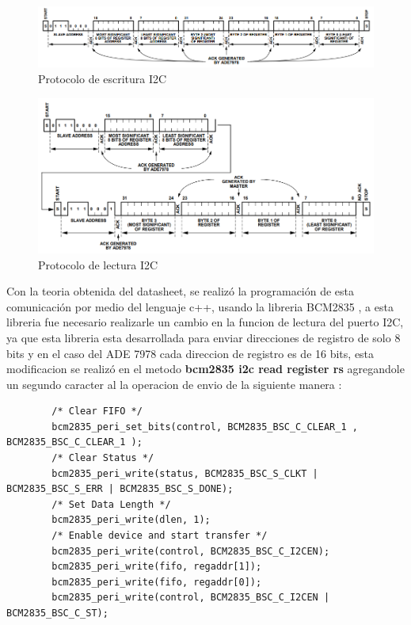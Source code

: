         \begin{figure}[H]
            \begin{center}
                \includegraphics[width = 15cm]{3Proyecto/I2CProtocol.PNG}
                \caption{ Protocolo de escritura I2C} 
                \label{fig:I2C protocol write}
            \end{center}
        \end{figure}
        \begin{figure}[H]
            \begin{center}
                \includegraphics[width = 15cm]{3Proyecto/I2CProtocolRead.PNG}
                \caption{ Protocolo de lectura I2C} 
                \label{fig:I2C protocol read}
            \end{center}
        \end{figure}

        Con la teoria obtenida del datasheet, se realizó la programación de esta comunicación por medio del lenguaje c++, usando la libreria BCM2835 \cite{A40}, a esta libreria fue necesario realizarle un cambio en la funcion de lectura del puerto I2C, ya que esta libreria esta desarrollada para enviar direcciones de registro de solo 8 bits y en el caso del ADE 7978 cada direccion de registro es de 16 bits, esta modificacion se realizó en el metodo \textbf{bcm2835 i2c read register rs} agregandole un segundo caracter al la operacion de envio de la siguiente manera :
        \begin{lstlisting}
        /* Clear FIFO */
        bcm2835_peri_set_bits(control, BCM2835_BSC_C_CLEAR_1 , BCM2835_BSC_C_CLEAR_1 );
        /* Clear Status */
        bcm2835_peri_write(status, BCM2835_BSC_S_CLKT | BCM2835_BSC_S_ERR | BCM2835_BSC_S_DONE);
        /* Set Data Length */
        bcm2835_peri_write(dlen, 1);
        /* Enable device and start transfer */
        bcm2835_peri_write(control, BCM2835_BSC_C_I2CEN);
        bcm2835_peri_write(fifo, regaddr[1]);
        bcm2835_peri_write(fifo, regaddr[0]);
        bcm2835_peri_write(control, BCM2835_BSC_C_I2CEN | BCM2835_BSC_C_ST);
        \end{lstlisting}


